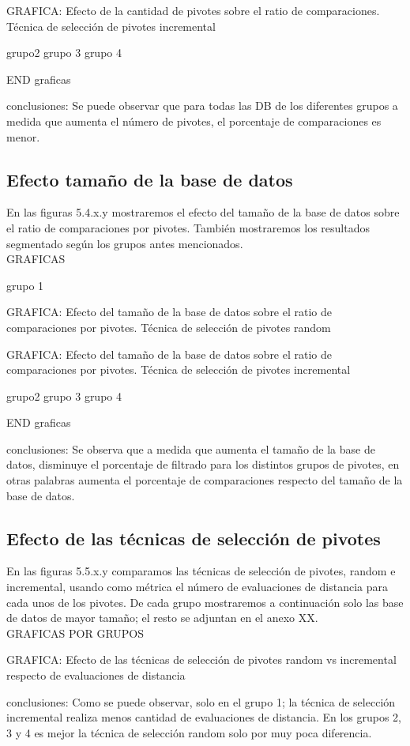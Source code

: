 GRAFICA: Efecto de la cantidad de pivotes sobre el ratio de comparaciones. T\'ecnica de selecci\'on de pivotes incremental

grupo2
grupo 3
grupo 4 

END graficas

conclusiones:
Se puede observar que para todas las DB de los diferentes grupos a medida que aumenta el n\'umero de pivotes, el porcentaje de comparaciones es menor.\\

\subsection{Efecto tamaño de la base de datos}

En las figuras 5.4.x.y mostraremos el efecto del tamaño de la base de datos sobre el ratio de comparaciones por pivotes. Tambi\'en mostraremos los resultados segmentado seg\'un los grupos antes mencionados.\\

GRAFICAS

grupo 1

GRAFICA: Efecto del tamaño de la base de datos sobre el ratio de comparaciones por pivotes. T\'ecnica de selecci\'on de pivotes random

GRAFICA:  Efecto del tamaño de la base de datos sobre el ratio de comparaciones por pivotes. T\'ecnica de selecci\'on de pivotes incremental


grupo2
grupo 3
grupo 4 

END graficas

conclusiones:
Se observa que a medida que aumenta el tamaño de la base de datos, disminuye el porcentaje de filtrado para los distintos grupos de pivotes, en otras palabras aumenta el porcentaje de comparaciones respecto del tamaño de la base de datos.\\

\subsection{Efecto de las t\'ecnicas de selecci\'on de pivotes}

En las figuras 5.5.x.y comparamos las t\'ecnicas de selecci\'on de pivotes, random e incremental, usando como m\'etrica el n\'umero de evaluaciones de distancia para cada unos de los pivotes. De cada grupo mostraremos a continuaci\'on solo las base de datos de mayor tamaño; el resto se adjuntan en el anexo XX.\\

GRAFICAS POR GRUPOS

 GRAFICA: Efecto de las t\'ecnicas de selecci\'on de pivotes random vs incremental respecto de evaluaciones de distancia
 
 conclusiones:
 Como se puede observar, solo en el grupo 1; la t\'ecnica de selecci\'on incremental realiza menos cantidad de evaluaciones de distancia. En los grupos 2, 3 y 4 es mejor la t\'ecnica de selecci\'on random solo por muy poca diferencia.\\
 
 
